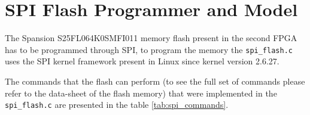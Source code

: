 

\newpage
\section{SPI Flash Programmer and Model}
The Spansion S25FL064K0SMFI011 memory flash present in the second FPGA has to be programmed through 
SPI, to program the memory the \texttt{spi\_flash.c} uses  the SPI kernel framework present in Linux 
since kernel version 2.6.27. 

The commands that the flash can perform (to see the full set of commands 
please refer to the data-sheet of the flash memory) that were implemented in the \texttt{spi\_flash.c} 
are presented in the table \ref{tab:spi_commands}.

